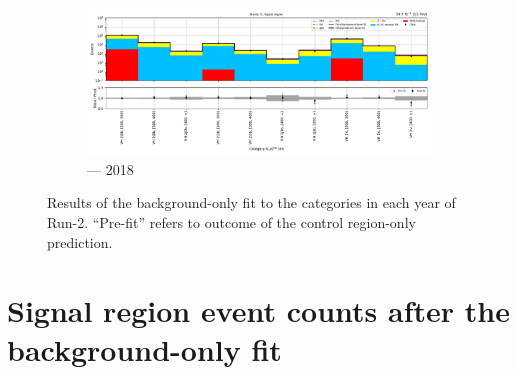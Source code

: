 \begin{figure}[htbp]
    \begin{subfigure}[b]{0.79\textwidth}
        \includegraphics[width=\textwidth]{chapters/higgstoinv/figures/mountain_ranges/2018/VH/SR_tree_fit_b-abs_values_VH_cats.pdf}
        \caption{\VH --- 2018}
    \end{subfigure}
    \caption[Results of the background-only fit to the \VH categories in each year of Run-2]{Results of the background-only fit to the \VH categories in each year of Run-2. ``Pre-fit'' refers to outcome of the control region-only prediction.}
    \label{fig:htoinv_mountain_range_B_only_VH_SR}
\end{figure}

\clearpage




\section{Signal region event counts after the background-only fit}
\label{sec:yield_tables_SR_B_only_fit}


